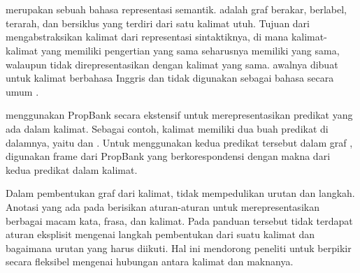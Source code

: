 \section{}

 merupakan sebuah bahasa representasi semantik.
\AMR{} adalah graf berakar, berlabel, terarah, dan bersiklus yang terdiri dari satu kalimat utuh.
Tujuan dari \AMR{} mengabstraksikan kalimat dari representasi sintaktiknya, di mana kalimat-kalimat yang memiliki pengertian yang sama seharusnya memiliki \AMR{} yang sama, walaupun tidak direpresentasikan dengan kalimat yang sama.
\AMR{} awalnya dibuat untuk kalimat berbahasa Inggris dan tidak digunakan sebagai bahasa secara umum .

\AMR{} menggunakan  PropBank  secara ekstensif untuk merepresentasikan predikat yang ada dalam kalimat.
Sebagai contoh, kalimat  memiliki dua buah predikat di dalamnya, yaitu  dan .
Untuk menggunakan kedua predikat tersebut dalam graf \AMR{}, digunakan frame dari PropBank yang berkorespondensi dengan makna dari kedua predikat dalam kalimat.

Dalam pembentukan graf dari kalimat, \AMR{} tidak mempedulikan urutan dan langkah.
Anotasi yang ada pada \AMR{} berisikan aturan-aturan untuk merepresentasikan berbagai macam kata, frasa, dan kalimat.
Pada panduan tersebut tidak terdapat aturan eksplisit mengenai langkah pembentukan \AMR{} dari suatu kalimat dan bagaimana urutan yang harus diikuti.
Hal ini mendorong peneliti untuk berpikir secara fleksibel mengenai hubungan antara kalimat dan maknanya.


